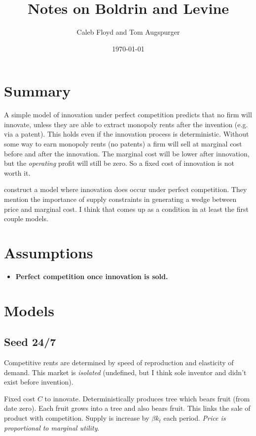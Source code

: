 \documentclass[11pt]{article}
\title{Notes on Boldrin and Levine}
\author{Caleb Floyd and Tom Augspurger}
\date{\today}
\begin{document}
\maketitle

\section{Summary}
\label{sec:summary}
  A simple model of innovation under perfect competition predicts that no firm will innovate, unless they are able to extract monopoly rents after the invention (e.g. via a patent).  This holds even if the innovation process is deterministic.  Without some way to earn monopoly rents (no patents) a firm will sell at marginal cost before and after the innovation.  The marginal cost will be lower after innovation, but the \emph{operating} profit will still be zero.  So a fixed cost of innovation is not worth it. 

  \cite{boldrin_levine:08:pci} construct a model where innovation does occur under perfect competition.  They mention the importance of supply constraints in generating a wedge between price and marginal cost.  I think that comes up as a condition in at least the first couple models.

\section{Assumptions}
\label{sec:assumptions}
  \begin{itemize}
    \item \textbf{Perfect competition once innovation is sold.}
  \end{itemize}

\section{Models}
\label{sec:models}
 
\subsection{Seed 24/7}
\label{sub:seed_24_7}

  Competitive rents are determined by speed of reproduction and elasticity of demand.  This market is \emph{isolated} (undefined, but I think sole inventor and didn't exist before invention).  

  Fixed cost $C$ to innovate.  Deterministically produces tree which bears fruit (from date zero).  Each fruit grows into a tree and also bears fruit.  This links the sale of product with competition.  Supply is increase by $\beta k_t$ each period.  \emph{Price is proportional to marginal utility}.
\end{document}
